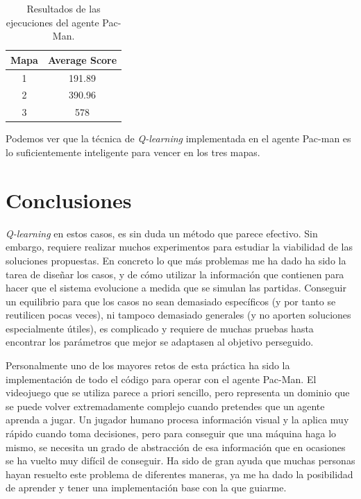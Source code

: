 \documentclass[11pt]{exam}
\begin{document}
\begin{table}[H]
	\centering
	\begin{tabular}{|c|c|} 
		\hline
		Mapa & Average Score \\ 
		\hline
		1 & 191.89 \\ 
		2 & 390.96 \\
		3 & 578 \\
		\hline
	\end{tabular}
	\caption{Resultados de las ejecuciones del agente Pac-Man.}
	\label{resultados_ejecuciones}
\end{table}

Podemos ver que la técnica de \textit{Q-learning} implementada en el agente Pac-man es lo suficientemente inteligente para vencer en los tres mapas.
 
\section{Conclusiones}\label{conclusiones}

\textit{Q-learning} en estos casos, es sin duda un método que parece efectivo. Sin embargo, requiere realizar muchos experimentos para estudiar la viabilidad de las soluciones propuestas. En concreto lo que más problemas me ha dado ha sido la tarea de diseñar los casos, y de cómo utilizar la información que contienen para hacer que el sistema evolucione a medida que se simulan las partidas. Conseguir un equilibrio para que los casos no sean demasiado específicos (y por tanto se reutilicen pocas veces), ni tampoco demasiado generales (y no aporten soluciones especialmente útiles), es complicado y requiere de muchas pruebas hasta encontrar los parámetros que mejor se adaptasen al objetivo perseguido.

Personalmente uno de los mayores retos de esta práctica ha sido la implementación de todo el código para operar con el agente Pac-Man. El videojuego que se utiliza parece a priori sencillo, pero representa un dominio que se puede volver extremadamente complejo cuando pretendes que un agente aprenda a jugar. Un jugador humano procesa información visual y la aplica muy rápido cuando toma decisiones, pero para conseguir que una máquina haga lo mismo, se necesita un grado de abstracción de esa información que en ocasiones se ha vuelto muy difícil de conseguir. Ha sido de gran ayuda que muchas personas hayan resuelto este problema de diferentes maneras, ya me ha dado la posibilidad de aprender y tener una implementación base con la que guiarme.
\end{document}
